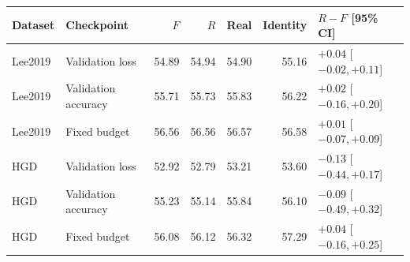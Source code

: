 \begin{tabular}{@{}llrrrrl@{}}
\toprule
Dataset & Checkpoint & $F$ & $R$ & Real & Identity & $R-F$ [95\% CI] \\
\midrule
Lee2019 & Validation loss & 54.89 & 54.94 & 54.90 & 55.16 & $+0.04$ [$ -0.02, +0.11 $] \\
Lee2019 & Validation accuracy & 55.71 & 55.73 & 55.83 & 56.22 & $+0.02$ [$ -0.16, +0.20 $] \\
Lee2019 & Fixed budget & 56.56 & 56.56 & 56.57 & 56.58 & $+0.01$ [$ -0.07, +0.09 $] \\
HGD & Validation loss & 52.92 & 52.79 & 53.21 & 53.60 & $-0.13$ [$ -0.44, +0.17 $] \\
HGD & Validation accuracy & 55.23 & 55.14 & 55.84 & 56.10 & $-0.09$ [$ -0.49, +0.32 $] \\
HGD & Fixed budget & 56.08 & 56.12 & 56.32 & 57.29 & $+0.04$ [$ -0.16, +0.25 $] \\
\bottomrule
\end{tabular}
